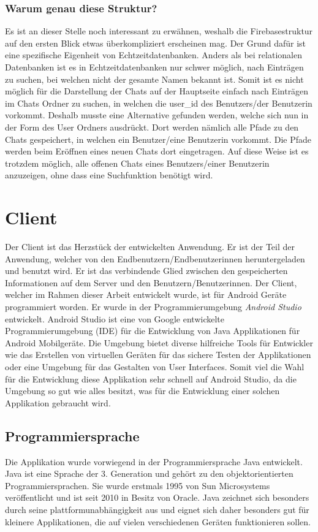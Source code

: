 \documentclass[a4paper,11pt]{report}
\begin{document}
				\subsubsection{Warum genau diese Struktur?} \label{warum}
				Es ist an dieser Stelle noch interessant zu erwähnen, weshalb die Firebasestruktur auf den ersten Blick etwas überkompliziert erscheinen mag. Der Grund dafür ist eine spezifische Eigenheit von Echtzeitdatenbanken. Anders als bei relationalen Datenbanken ist es in Echtzeitdatenbanken nur schwer möglich, nach Einträgen zu suchen, bei welchen nicht der gesamte Namen bekannt ist. Somit ist es nicht möglich für die Darstellung der Chats auf der Hauptseite einfach nach Einträgen im Chats Ordner zu suchen, in welchen die user\_id des Benutzers/der Benutzerin vorkommt. Deshalb musste eine Alternative gefunden werden, welche sich nun in der Form des User Ordners ausdrückt. Dort werden nämlich alle Pfade zu den Chats gespeichert, in welchen ein Benutzer/eine Benutzerin vorkommt. Die Pfade werden beim Eröffnen eines neuen Chats dort eingetragen. Auf diese Weise ist es trotzdem möglich, alle offenen Chats eines Benutzers/einer Benutzerin anzuzeigen, ohne dass eine Suchfunktion benötigt wird.
		\section{Client} \label{client}
		Der Client ist das Herzstück der entwickelten Anwendung. Er ist der Teil der Anwendung, welcher von den Endbenutzern/Endbenutzerinnen heruntergeladen und benutzt wird. Er ist das verbindende Glied zwischen den gespeicherten Informationen auf dem Server und den Benutzern/Benutzerinnen. Der Client, welcher im Rahmen dieser Arbeit entwickelt wurde, ist für Android Geräte programmiert worden. Er wurde in der Programmierumgebung \emph{Android Studio} entwickelt. Android Studio ist eine von Google entwickelte Programmierumgebung (IDE) für die Entwicklung von Java Applikationen für Android Mobilgeräte. Die Umgebung bietet diverse hilfreiche Tools für Entwickler wie das Erstellen von virtuellen  Geräten für das sichere Testen der Applikationen oder eine Umgebung für das Gestalten von User Interfaces. Somit viel die Wahl für die Entwicklung diese Applikation sehr schnell auf Android Studio, da die Umgebung so gut wie alles besitzt, was für die Entwicklung einer solchen Applikation gebraucht wird.
			\subsection{Programmiersprache}
			Die Applikation wurde vorwiegend in der Programmiersprache Java entwickelt. Java ist eine Sprache der 3. Generation und gehört zu den objektorientierten Programmiersprachen. Sie wurde erstmals 1995 von Sun Microsystems veröffentlicht und ist seit 2010 in Besitz von Oracle. Java zeichnet sich besonders durch seine plattformunabhängigkeit aus und eignet sich daher besonders gut für kleinere Applikationen, die auf vielen verschiedenen Geräten funktionieren sollen.
			
\end{document}
